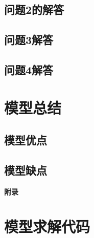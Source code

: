 \documentclass{cumcm}
\begin{document}
\subsection{问题2的解答}
\subsection{问题3解答}
\subsection{问题4解答}
\section{模型总结}

\subsection{模型优点}

\subsection{模型缺点}




\begin{thebibliography}{99}
\end{thebibliography}

\newpage
\appendix
\textbf{附录}
\section{模型求解代码}
\end{document}
